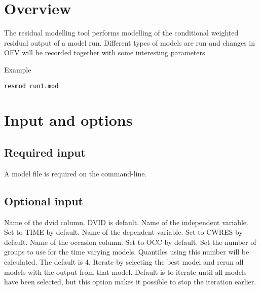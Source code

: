 



\maketitle
\newcommand{\guidetoolname}{resmod}


\section{Overview}
The residual modelling tool performs modelling of the conditional weighted residual output of a model run. Different types of models are run and changes in OFV will be recorded together with some interesting parameters.

Example
\begin{verbatim}
resmod run1.mod
\end{verbatim}

\section{Input and options}

\subsection{Required input}
A model file is required on the command-line.

\subsection{Optional input}

\begin{optionlist}
Name of the dvid column. DVID is default.
\nextopt
{}
Name of the independent variable. Set to TIME by default.
\nextopt
        Name of the dependent variable. Set to CWRES by default.
    \nextopt
{}
Name of the occasion column. Set to OCC by default.
\nextopt
{}
      Set the number of groups to use for the time varying models.     
      Quantiles using this number will be calculated.
      The default is 4.
\nextopt
        Iterate by selecting the best model and rerun all models with the output from that model.
    \nextopt
        Default is to iterate until all models have been selected, but this option makes it possible
        to stop the iteration earlier.
    \nextopt
\end{optionlist}

